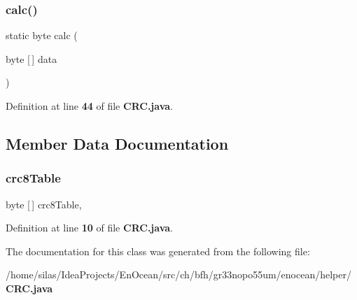 \subsubsection{calc()}
{\footnotesize\ttfamily static byte calc (\begin{DoxyParamCaption}\item[{byte [$\,$]}]{data }\end{DoxyParamCaption})\hspace{0.3cm}{\ttfamily [static]}}



Definition at line {\bf 44} of file {\bf C\+R\+C.\+java}.



\subsection{Member Data Documentation}
\label{classch_1_1bfh_1_1gr33nopo55um_1_1enocean_1_1helper_1_1CRC_a3e402bbcde6dc6c78939936f69c8f963} 
\subsubsection{crc8\+Table}
{\footnotesize\ttfamily byte [$\,$] crc8\+Table\hspace{0.3cm}{\ttfamily [static]}, {\ttfamily [private]}}



Definition at line {\bf 10} of file {\bf C\+R\+C.\+java}.



The documentation for this class was generated from the following file\+:\begin{DoxyCompactItemize}
\item 
/home/silas/\+Idea\+Projects/\+En\+Ocean/src/ch/bfh/gr33nopo55um/enocean/helper/{\bf C\+R\+C.\+java}\end{DoxyCompactItemize}
